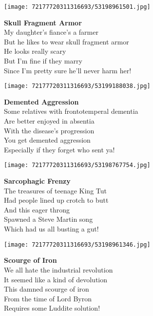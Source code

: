 \documentclass[10pt,letterpaper]{article}
\begin{document}
\begin{center}\texttt{[image: 72177720311316693/53198961501.jpg]}
\end{center}
\begin{center}
\textbf{Skull Fragment Armor}\\
\vskip 0.2in
My daughter's fiance's a farmer\\
But he likes to wear skull fragment armor\\
He looks really scary\\
But I'm fine if they marry\\
Since I'm pretty sure he'll never harm her!\\
\end{center}
\pagebreak

\begin{center}\texttt{[image: 72177720311316693/53199188038.jpg]}
\end{center}
\begin{center}
\textbf{Demented Aggression}\\
\vskip 0.2in
Some relatives with frontotemperal dementia\\
Are better enjoyed in absentia\\
With the disease's progression\\
You get demented aggression\\
Especially if they forget who sent ya!\\
\end{center}
\pagebreak

\begin{center}\texttt{[image: 72177720311316693/53198767754.jpg]}
\end{center}
\begin{center}
\textbf{Sarcophagic Frenzy}\\
\vskip 0.2in
The treasures of teenage King Tut\\
Had people lined up crotch to butt\\
And this eager throng\\
Spawned a Steve Martin song\\
Which had us all busting a gut!\\
\end{center}
\pagebreak

\begin{center}\texttt{[image: 72177720311316693/53198961346.jpg]}
\end{center}
\begin{center}
\textbf{Scourge of Iron}\\
\vskip 0.2in
We all hate the industrial revolution\\
It seemed like a kind of devolution\\
This damned scourge of iron\\
From the time of Lord Byron\\
Requires some Luddite solution!\\
\end{center}
\pagebreak
\end{document}
